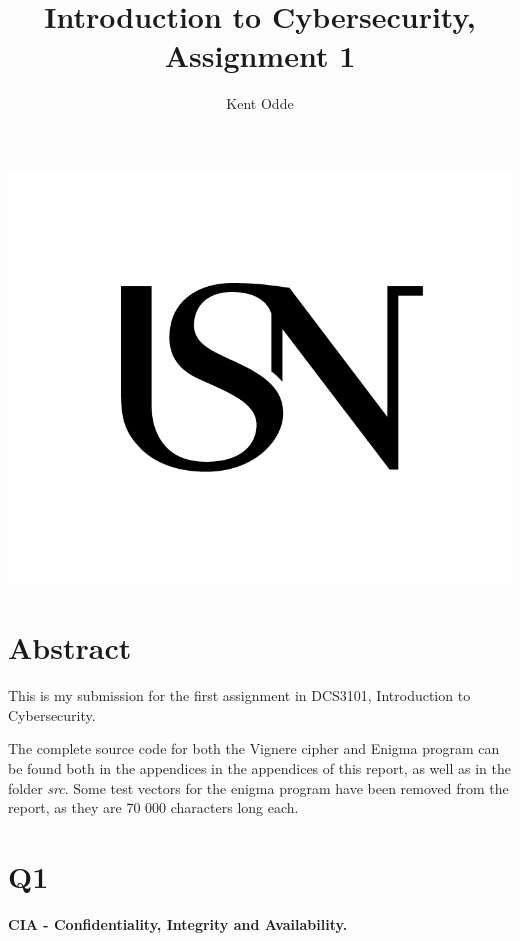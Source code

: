 \documentclass{article}
\begin{document}
\author{Kent Odde}
\title{Introduction to Cybersecurity, Assignment 1}

\maketitle
\thispagestyle{empty}
\begin{center}
\includegraphics[width=\linewidth,height=0.2\textheight,keepaspectratio]{img/USN.png}
\end{center}
\newpage

\tableofcontents

\newpage

\section{Abstract}

This is my submission for the first assignment in DCS3101, Introduction to Cybersecurity. 

The complete source code for both the Vignere cipher and Enigma program can be found both in the appendices in the appendices of this report, as well as in the folder \textit{src}. Some test vectors for the enigma program have been removed from the report, as they are 70 000 characters long each. 

\section{Q1}

\textbf{CIA - Confidentiality, Integrity and Availability.}
\end{document}
